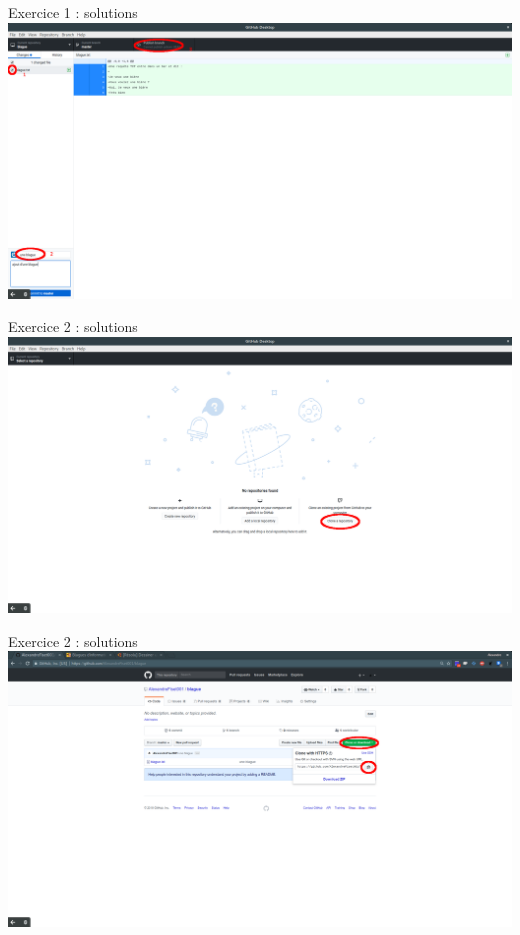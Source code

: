 \documentclass{beamer}
\begin{document}
\begin{frame}{Exercice 1 : solutions}
	\centering
    \includegraphics[scale=0.16]{img/image_exercices/add+commit+push_1.png}
\end{frame}

\begin{frame}{Exercice 2 : solutions}
	\centering
    \includegraphics[scale=0.16]{img/image_exercices/clonning_repo.png}
\end{frame}

\begin{frame}{Exercice 2 : solutions}
	\centering
    \includegraphics[scale=0.16]{img/image_exercices/get_url_all_time.png}
\end{frame}
\end{document}
